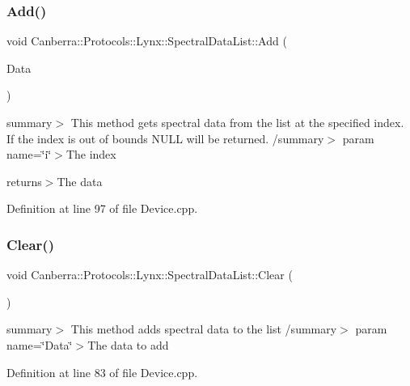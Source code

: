 \subsubsection{\texorpdfstring{Add()}{Add()}}
{\footnotesize\ttfamily void Canberra\+::\+Protocols\+::\+Lynx\+::\+Spectral\+Data\+List\+::\+Add (\begin{DoxyParamCaption}\item[{\hyperlink{class_canberra_1_1_data_types_1_1_spectroscopy_1_1_spectral_data}{Canberra\+::\+Data\+Types\+::\+Spectroscopy\+::\+Spectral\+Data} $\ast$}]{Data }\end{DoxyParamCaption})}

summary$>$ This method gets spectral data from the list at the specified index. If the index is out of bounds N\+U\+LL will be returned. /summary$>$ param name=\char`\"{}i\char`\"{}$>$The index

returns$>$The data

Definition at line 97 of file Device.\+cpp.

\mbox{\label{class_canberra_1_1_protocols_1_1_lynx_1_1_spectral_data_list_a2241de079482e6de9f1364579b1450e6_a2241de079482e6de9f1364579b1450e6}} 
\subsubsection{\texorpdfstring{Clear()}{Clear()}}
{\footnotesize\ttfamily void Canberra\+::\+Protocols\+::\+Lynx\+::\+Spectral\+Data\+List\+::\+Clear (\begin{DoxyParamCaption}\item[{void}]{ }\end{DoxyParamCaption})}

summary$>$ This method adds spectral data to the list /summary$>$ param name=\char`\"{}\+Data\char`\"{}$>$The data to add

Definition at line 83 of file Device.\+cpp.

\mbox{\label{class_canberra_1_1_protocols_1_1_lynx_1_1_spectral_data_list_aab442905d6001018402dc21bfa33e0be_aab442905d6001018402dc21bfa33e0be}} 
